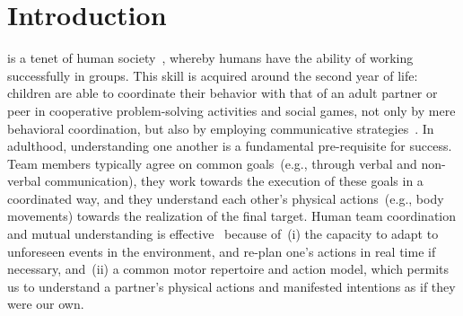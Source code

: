 
\section{Introduction}
\label{sec:intro}

 is a tenet of human society~\cite{turner:1975}, whereby humans have the ability of working successfully in groups.
This skill is acquired around the second year of life: children are able to coordinate their behavior with that of an adult partner or peer in cooperative problem-solving activities and social games, not only by mere behavioral coordination, but also by
employing communicative strategies~\cite{melis:2010:rstb}.
In adulthood, understanding one another is a fundamental pre-requisite for success.
Team members typically agree on common goals~(e.g., through verbal and non-verbal communication), they work towards the execution of these goals in a coordinated way, and they understand each other's physical actions~(e.g., body movements) towards the realization of the final target.
Human team coordination and mutual understanding is effective~\cite{ramnani:2004:natureneuro} because of~(i) the capacity to adapt to unforeseen events in the environment, and re-plan one's actions in real time if necessary, and~(ii) a common motor repertoire and action model, which permits us to understand a partner's physical actions and manifested intentions as if they were our own.
